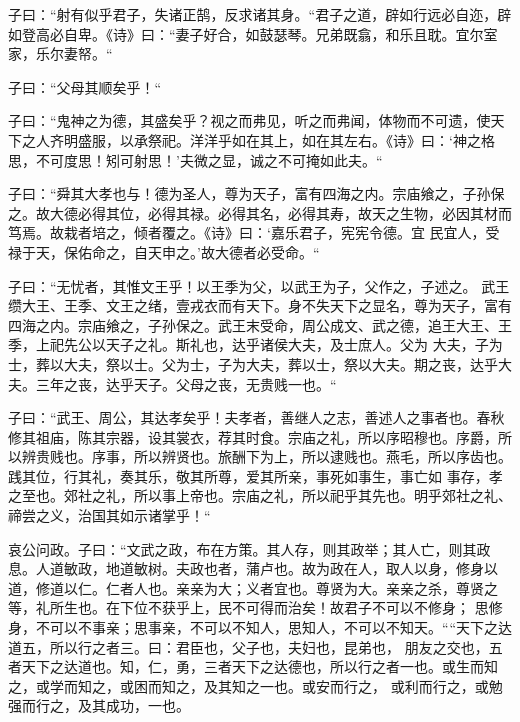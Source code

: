 \documentclass[]{article}
\begin{document}
子曰：``射有似乎君子，失诸正鹄，反求诸其身。``君子之道，辟如行远必自迩，辟如登高必自卑。《诗》曰：``妻子好合，如鼓瑟琴。兄弟既翕，和乐且耽。宜尔室家，乐尔妻帑。``

子曰：``父母其顺矣乎！``

子曰：``鬼神之为德，其盛矣乎？视之而弗见，听之而弗闻，体物而不可遗，使天下之人齐明盛服，以承祭祀。洋洋乎如在其上，如在其左右。《诗》曰：`神之格思，不可度思！矧可射思！'夫微之显，诚之不可掩如此夫。``

子曰：``舜其大孝也与！德为圣人，尊为天子，富有四海之内。宗庙飨之，子孙保之。故大德必得其位，必得其禄。必得其名，必得其寿，故天之生物，必因其材而笃焉。故栽者培之，倾者覆之。《诗》曰：`嘉乐君子，宪宪令德。宜
民宜人，受禄于天，保佑命之，自天申之。'故大德者必受命。``

子曰：``无忧者，其惟文王乎！以王季为父，以武王为子，父作之，子述之。
武王缵大王、王季、文王之绪，壹戎衣而有天下。身不失天下之显名，尊为天子，富有四海之内。宗庙飨之，子孙保之。武王末受命，周公成文、武之德，追王大王、王季，上祀先公以天子之礼。斯礼也，达乎诸侯大夫，及士庶人。父为
大夫，子为士，葬以大夫，祭以士。父为士，子为大夫，葬以士，祭以大夫。期之丧，达乎大夫。三年之丧，达乎天子。父母之丧，无贵贱一也。``

子曰：``武王、周公，其达孝矣乎！夫孝者，善继人之志，善述人之事者也。春秋修其祖庙，陈其宗器，设其裳衣，荐其时食。宗庙之礼，所以序昭穆也。序爵，所以辨贵贱也。序事，所以辨贤也。旅酬下为上，所以逮贱也。燕毛，所以序齿也。践其位，行其礼，奏其乐，敬其所尊，爱其所亲，事死如事生，事亡如
事存，孝之至也。郊社之礼，所以事上帝也。宗庙之礼，所以祀乎其先也。明乎郊社之礼、禘尝之义，治国其如示诸掌乎！``

哀公问政。子曰：``文武之政，布在方策。其人存，则其政举；其人亡，则其政息。人道敏政，地道敏树。夫政也者，蒲卢也。故为政在人，取人以身，修身以道，修道以仁。仁者人也。亲亲为大；义者宜也。尊贤为大。亲亲之杀，尊贤之等，礼所生也。在下位不获乎上，民不可得而治矣！故君子不可以不修身；
思修身，不可以不事亲；思事亲，不可以不知人，思知人，不可以不知天。````天下之达道五，所以行之者三。曰：君臣也，父子也，夫妇也，昆弟也，
朋友之交也，五者天下之达道也。知，仁，勇，三者天下之达德也，所以行之者一也。或生而知之，或学而知之，或困而知之，及其知之一也。或安而行之，
或利而行之，或勉强而行之，及其成功，一也。
\end{document}

